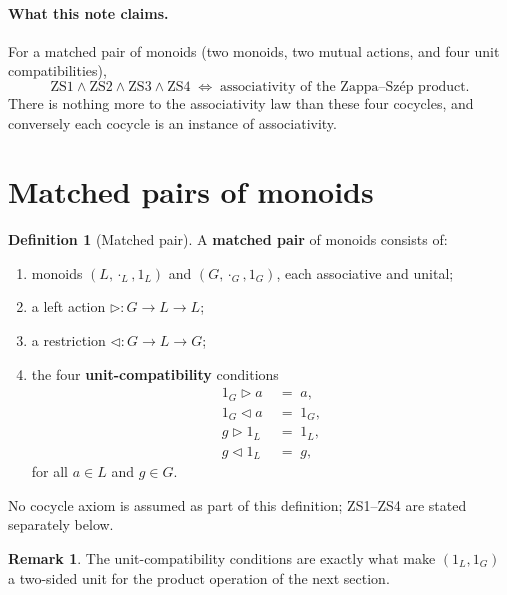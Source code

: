 \documentclass[11pt,a4paper]{article}
\theoremstyle{plain}
\theoremstyle{definition}
\newtheorem{definition}[theorem]{Definition}
\newtheorem{remark}[theorem]{Remark}
\begin{document}
\paragraph{What this note claims.}
For a matched pair of monoids (two monoids, two mutual actions, and four unit
compatibilities),
\[
  \text{ZS1} \wedge \text{ZS2} \wedge \text{ZS3} \wedge \text{ZS4}
  \;\Longleftrightarrow\;
  \text{associativity of the Zappa--Sz\'{e}p product}.
\]
There is nothing more to the associativity law than these four cocycles, and
conversely each cocycle is an instance of associativity.

\section{Matched pairs of monoids}

\begin{definition}[Matched pair]\label{def:matched-pair}
A \textbf{matched pair} of monoids consists of:
\begin{enumerate}
  \item monoids $(L, \cdot_L, 1_L)$ and $(G, \cdot_G, 1_G)$, each associative
        and unital;
  \item a left action $\triangleright : G \to L \to L$;
  \item a restriction $\triangleleft : G \to L \to G$;
  \item the four \textbf{unit-compatibility} conditions
        \begin{align}
          \tag{U1a}
          1_G \triangleright a &\;=\; a, \\
          \tag{U1b}
          1_G \triangleleft a &\;=\; 1_G, \\
          \tag{U2a}
          g \triangleright 1_L &\;=\; 1_L, \\
          \tag{U2b}
          g \triangleleft 1_L &\;=\; g,
        \end{align}
        for all $a \in L$ and $g \in G$.
\end{enumerate}
No cocycle axiom is assumed as part of this definition; ZS1--ZS4 are stated
separately below.
\end{definition}

\begin{remark}
The unit-compatibility conditions are exactly what make $(1_L, 1_G)$ a
two-sided unit for the product operation of the next section.
\end{remark}
\end{document}
